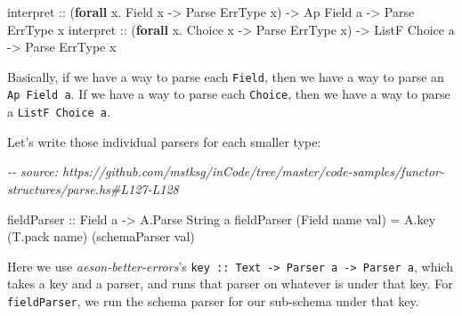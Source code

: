 \documentclass[]{article}
\newenvironment{Shaded}{}{}
\newcommand{\CommentTok}[1]{\textcolor[rgb]{0.38,0.63,0.69}{\textit{#1}}}
\newcommand{\DataTypeTok}[1]{\textcolor[rgb]{0.56,0.13,0.00}{#1}}
\newcommand{\KeywordTok}[1]{\textcolor[rgb]{0.00,0.44,0.13}{\textbf{#1}}}
\newcommand{\NormalTok}[1]{#1}
\newcommand{\OperatorTok}[1]{\textcolor[rgb]{0.40,0.40,0.40}{#1}}
\newcommand{\OtherTok}[1]{\textcolor[rgb]{0.00,0.44,0.13}{#1}}
\newcommand{\StringTok}[1]{\textcolor[rgb]{0.25,0.44,0.63}{#1}}
\begin{document}
\begin{Shaded}
\begin{Highlighting}[]
\OtherTok{interpret ::}\NormalTok{ (}\KeywordTok{forall}\NormalTok{ x}\OperatorTok{.} \DataTypeTok{Field}\NormalTok{  x }\OtherTok{{-}>} \DataTypeTok{Parse} \DataTypeTok{ErrType}\NormalTok{ x) }\OtherTok{{-}>} \DataTypeTok{Ap}    \DataTypeTok{Field}\NormalTok{  a }\OtherTok{{-}>} \DataTypeTok{Parse} \DataTypeTok{ErrType}\NormalTok{ x}
\OtherTok{interpret ::}\NormalTok{ (}\KeywordTok{forall}\NormalTok{ x}\OperatorTok{.} \DataTypeTok{Choice}\NormalTok{ x }\OtherTok{{-}>} \DataTypeTok{Parse} \DataTypeTok{ErrType}\NormalTok{ x) }\OtherTok{{-}>} \DataTypeTok{ListF} \DataTypeTok{Choice}\NormalTok{ a }\OtherTok{{-}>} \DataTypeTok{Parse} \DataTypeTok{ErrType}\NormalTok{ x}
\end{Highlighting}
\end{Shaded}

Basically, if we have a way to parse each \texttt{Field}, then we have a way to
parse an \texttt{Ap\ Field\ a}. If we have a way to parse each \texttt{Choice},
then we have a way to parse a \texttt{ListF\ Choice\ a}.

Let's write those individual parsers for each smaller type:

\begin{Shaded}
\begin{Highlighting}[]
\CommentTok{{-}{-} source: https://github.com/mstksg/inCode/tree/master/code{-}samples/functor{-}structures/parse.hs\#L127{-}L128}

\OtherTok{fieldParser ::} \DataTypeTok{Field}\NormalTok{ a }\OtherTok{{-}>} \DataTypeTok{A.Parse} \DataTypeTok{String}\NormalTok{ a}
\NormalTok{fieldParser (}\DataTypeTok{Field}\NormalTok{ name val) }\OtherTok{=}\NormalTok{ A.key (T.pack name) (schemaParser val)}
\end{Highlighting}
\end{Shaded}

Here we use \emph{aeson-better-errors}'s
\texttt{key\ ::\ Text\ -\textgreater{}\ Parser\ a\ -\textgreater{}\ Parser\ a},
which takes a key and a parser, and runs that parser on whatever is under that
key. For \texttt{fieldParser}, we run the schema parser for our sub-schema under
that key.

\begin{Shaded}
\end{Shaded}
\end{document}
